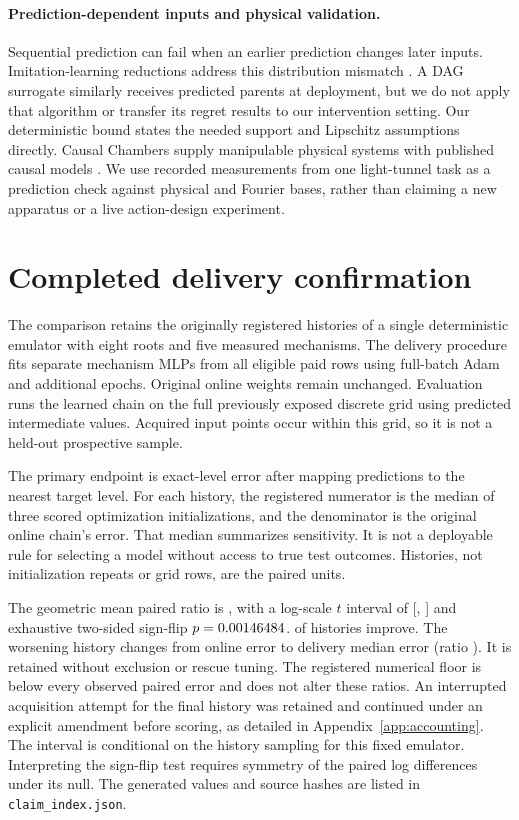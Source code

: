 \paragraph{Prediction-dependent inputs and physical validation.}
Sequential prediction can fail when an earlier prediction changes later inputs.
Imitation-learning reductions address this distribution mismatch
\citep{ross2011reduction}. A DAG surrogate similarly receives predicted parents
at deployment, but we do not apply that algorithm or transfer its regret
results to our intervention setting. Our deterministic bound states the needed
support and Lipschitz assumptions directly. Causal Chambers supply manipulable
physical systems with published causal models \citep{gamella2025chambers}. We use
recorded measurements from one light-tunnel task as a prediction check against physical and
Fourier bases, rather than claiming a new apparatus or a live action-design
experiment.

\section{Completed delivery confirmation}
\label{sec:confirmation}
The comparison retains the originally registered \DeliveryN{} histories of a
single deterministic emulator with eight roots and five measured mechanisms.
The delivery procedure fits separate mechanism
MLPs from all eligible paid rows using full-batch Adam and additional epochs.
Original online weights remain unchanged. Evaluation runs the learned chain on
the full previously exposed discrete grid using predicted intermediate values.
Acquired input points occur within this grid, so it is not a held-out prospective
sample.

The primary endpoint is exact-level error after mapping predictions to the
nearest target level. For each history, the registered numerator is the median
of three scored optimization initializations, and the denominator is the original
online chain's error. That median summarizes sensitivity. It is not a deployable
rule for selecting a model without access to true test outcomes. Histories,
not initialization repeats or grid rows, are the paired units.

The geometric mean paired ratio is \DeliveryRatio{}, with a log-scale
$t$ interval of [\DeliveryCILow{}, \DeliveryCIHigh{}] and exhaustive two-sided
sign-flip $p=0.00146484{}$. \DeliveryWins{} of \DeliveryN{} histories improve.
The worsening history \WorseSeed{} changes from \WorseOnline{} online error
to \WorseDelivery{} delivery median error (ratio \WorseRatio{}). It is retained
without exclusion or rescue tuning. The registered numerical floor is below every observed paired error and does
not alter these ratios. An interrupted acquisition attempt for the final history
was retained and continued under an explicit amendment before scoring, as
detailed in Appendix~\ref{app:accounting}. The interval is conditional on the history sampling
for this fixed emulator. Interpreting the sign-flip test requires symmetry
of the paired log differences under its null. The generated values and source
hashes are listed in \texttt{claim\_index.json}.

